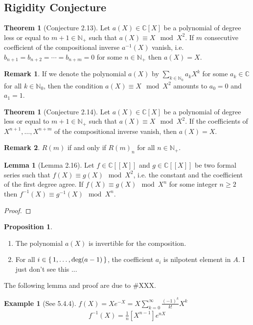 \documentclass[a4paper]{article}
\theoremstyle{definition}
\newtheorem{example}{Example}[definition]
\newtheorem{theorem}[definition]{Theorem}
\newtheorem{lemma}[definition]{Lemma}
\newtheorem{proposition}[definition]{Proposition}
\newtheorem*{remark}{Remark}
\newcommand{\set}[1]{\mleft\{\, #1 \,\mright\}}
\begin{document}
\subsection{Rigidity Conjecture}
%
\begin{theorem}[Conjecture 2.13]
    Let \(a(X) \in \mathbb{C}[X]\) be a polynomial of degree less or equal to \(m + 1 \in \mathbb{N}_+\) such that \(a(X) \equiv X \mod{X^2}\). If \(m\) consecutive coefficient of the compositional inverse \(a^{-1}(X)\) vanish, i.e. \(b_{n+1} = b_{n+2} = \cdots = b_{n+m} = 0\) for some \(n \in \mathbb{N}_+\) then \(a(X) = X\).
\end{theorem}
%
\begin{remark}
    If we denote the polynomial \(a(X)\) by \(\sum_{k \in \mathbb{N}_0}a_k X^k\) for some \(a_k \in \mathbb{C}\) for all \(k \in \mathbb{N}_0\), then the condition \(a(X) \equiv X \mod{X^2}\) amounts to \(a_0 = 0\) and \(a_1 = 1\).
\end{remark}
%
\begin{theorem}[Conjecture 2.14]
    Let \(a(X) \in \mathbb{C}[X]\) be a polynomial of degree less or equal to \(m + 1 \in \mathbb{N}_+\) such that \(a(X) \equiv X \mod{X^2}\). If the coefficients of \(X^{n+1}, \ldots, X^{n+m}\) of the compositional inverse vanish, then \(a(X) = X\).
\end{theorem}
%
\begin{remark}
    \(R(m)\) if and only if \(R(m)_n\) for all \(n \in \mathbb{N}_+\).
\end{remark}
%
\begin{lemma}[Lemma 2.16]
    Let \(f \in \mathbb{C}[[X]]\) and \(g \in \mathbb{C}[[X]]\) be two formal series such that \(f(X) \equiv g(X) \mod{X^2}\), i.e. the constant and the coefficient of the first degree agree. If \(f(X) \equiv g(X) \mod{X^n}\) for some integer \(n \geq 2\) then \(f^{-1}(X) \equiv g^{-1}(X) \mod{X^n}\).
\end{lemma}
\begin{proof}
\end{proof}
%
\begin{proposition}
    \begin{enumerate}
        \item The polynomial \(a(X)\) is invertible for the composition.
        \item For all \(i \in \set{1, \ldots, \text{deg}(a - 1)}\), the coefficient \(a_i\) is nilpotent element in \(A\).
              I just don't see this ...
    \end{enumerate}
\end{proposition}
%
The following lemma and proof are due to \#XXX.
%
\begin{example}[See 5.4.4]
    \(f(X) = X e^{-X} = X \sum_{k=0}^\infty \frac{(-1)^k}{k!} X^k\)
    \begin{align*}
        [X^n]f^{-1}(X) = \frac{1}{n} [X^{n-1}] e^{nX}
    \end{align*}
\end{example}
\end{document}
